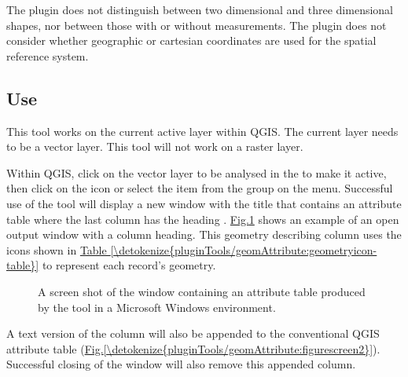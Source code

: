 \documentclass[a4paper,11pt,english]{sphinxmanual}
\begin{document}
The plugin does not distinguish between two dimensional and three dimensional shapes, nor between those with or without measurements.  The plugin does not consider whether geographic or cartesian coordinates are used for the spatial reference system.


\subsection{Use}
\label{\detokenize{pluginTools/geomAttribute:use}}
This tool works on the current active layer within QGIS.  The current layer needs to be a vector layer.  This tool will not work on a raster layer.

Within QGIS, click on the vector layer to be analysed in the  to make it active, then click on the  icon  or select the  item from the  group on the  menu.  Successful use of the  tool will display a new window with the title  that contains an attribute table where the last column has the heading .  \hyperref[\detokenize{pluginTools/geomAttribute:figurescreen}]{Fig.\@ \ref{\detokenize{pluginTools/geomAttribute:figurescreen}}} shows an example of an open  output window with a  column heading. This geometry describing column uses the icons shown in \hyperref[\detokenize{pluginTools/geomAttribute:geometryicon-table}]{Table \ref{\detokenize{pluginTools/geomAttribute:geometryicon-table}}} to represent each record’s geometry.

\begin{figure}[htbp]
\centering
\capstart

\noindent{}
\caption{A screen shot of the window containing an attribute table produced by the  tool in a Microsoft Windows environment.}\label{\detokenize{pluginTools/geomAttribute:id2}}\label{\detokenize{pluginTools/geomAttribute:figurescreen}}\end{figure}

A text version of the  column will also be appended to the conventional QGIS attribute table (\hyperref[\detokenize{pluginTools/geomAttribute:figurescreen2}]{Fig.\@ \ref{\detokenize{pluginTools/geomAttribute:figurescreen2}}}).  Successful closing of the  window will also remove this appended  column.
\end{document}
